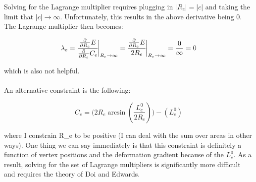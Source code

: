 \documentclass[12pt]{article}
\begin{document}
Solving for the Lagrange multiplier requires plugging in $|R_e| = |c|$ and taking the limit that $|c|\to\infty$. Unfortunately, this results in the above derivative being $0$. The Lagrange multiplier then becomes:
\begin{center}
\begin{equation}
\lambda_e = \cfrac{\pdv{R_e}E}{\pdv{R_e}C_e}\bigg\vert_{R_e \to \infty} = \cfrac{\pdv{R_e}E}{2 R_e}\bigg\vert_{R_e \to \infty} = \frac{0}{\infty} = 0
\end{equation}
\end{center}
which is also not helpful. \\ \\
An alternative constraint is the following:
\begin{center}
\begin{equation}
\label{eqn: toughconstraint}
C_e = \Bigg(2 R_e \arcsin(\frac{L_e^0}{2 R_e})\Bigg) - (L_e^0)
\end{equation}
\end{center}

where I constrain R_e to be positive (I can deal with the sum over areas in other ways). One thing we can say immediately is that this constraint is definitely a function of vertex positions and the deformation gradient because of the $L_e^0$. As a result, solving for the set of Lagrange multipliers is significantly more difficult and requires the theory of Doi and Edwards. 
\end{document}
